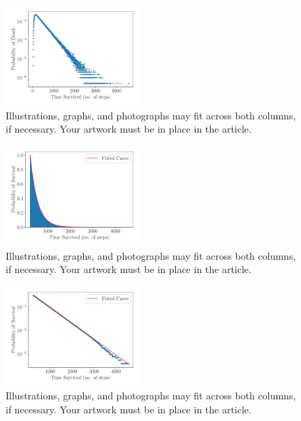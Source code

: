 \documentclass[journal]{IEEEtran}
\begin{document}
\begin{figure}[H]%
  \begin{center}
    \includegraphics[width=0.45\textwidth]{images/line_plot.pdf}
    \caption{Illustrations, graphs, and photographs may fit across both columns, if necessary. Your artwork must be in place in the article.}
    \label{fig:line_plot}
  \end{center}
\end{figure}


\begin{figure}[H]%
  \begin{center}
    \includegraphics[width=0.45\textwidth]{images/cum_exp_plot.pdf}
    \caption{Illustrations, graphs, and photographs may fit across both columns, if necessary. Your artwork must be in place in the article.}
    \label{fig:cum_exp_plot}
  \end{center}
\end{figure}


\begin{figure}[H]%
  \begin{center}
    \includegraphics[width=0.45\textwidth]{images/cum_line_plot.pdf}
    \caption{Illustrations, graphs, and photographs may fit across both columns, if necessary. Your artwork must be in place in the article.}
    \label{fig:cum_line_plot}
  \end{center}
\end{figure}
\end{document}
